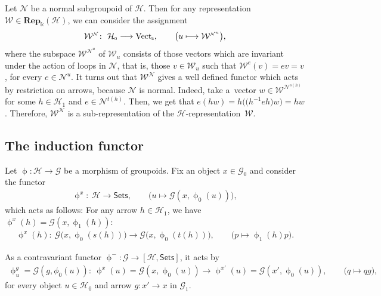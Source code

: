 \documentclass[10pt,a4paper]{amsart}
\numberwithin{equation}{section}
\newcommand{\Rep}[1]{\mathbf{Rep}_{\Sscript{\Bbbk}}(#1)}
\newcommand{\Vect}{{\rm Vect}_{\Sscript{\Bbbk}}}
\newcommand{\Go}{\cG_{\Sscript{0}}}
\newcommand{\Ga}{\cG_{\Sscript{1}}}
\newcommand{\Ho}{\cH_{\Sscript{0}}}
\newcommand{\Ha}{\cH_{\Sscript{1}}}
\newcommand{\Wu}{\cW_{\Sscript{u}}}
\newcommand{\We}{\cW^{\Sscript{e}}}
\newcommand{\cG}{{\mathcal G}}
\newcommand{\cH}{{\mathcal H}}
\newcommand{\cN}{{\mathcal N}}
\newcommand{\cW}{{\mathcal W}}
\newcommand{\phix}{\upphi^{\Sscript{x}}}
\newcommand{\phixp}{\upphi^{\Sscript{x'}}}
\newcommand{\Sets}{\mathsf{Sets}}
\newcommand{\Sscript}[1]{\scriptscriptstyle{#1}}
\begin{document}
\begin{Remark}\label{rem:WN} Let $\cN$ be a normal subgroupoid of $\cH$. Then for any representation $\cW \in \Rep{\cH}$, we can consider the assignment
\begin{gather*}
\cW^{\Sscript{\cN}}\colon \ \Ho \longrightarrow \Vect, \qquad \big( u \longmapsto \cW^{\Sscript{\cN^u}} \big),
\end{gather*}
where the subspace $\cW^{\Sscript{\cN^u}}$ of $\Wu$ consists of those vectors which are invariant under the action of loops in $\cN$, that is, those $v \in \Wu$ such that $\We(v)=e v=v$, for every $e \in \cN^{\Sscript{u}}$. It turns out that $\cW^{\Sscript{\cN}}$ gives a well defined functor which acts by restriction on arrows, because $\cN$ is normal. Indeed, take a~vector $w \in \cW^{\Sscript{\cN^{s(h)}}}$ for some $h \in \Ha$ and $e \in \cN^{\Sscript{t(h)}}$. Then, we get that $e (h w)= h \big(\big(h^{-1}eh\big)w \big)=h w$. Therefore, $\cW^{\Sscript{\cN}}$ is a sub-representation of the $\cH$-representation~$\cW$.
\end{Remark}

\subsection{The induction functor}\label{ssec:Ind}
Let $\upphi: \cH \to \cG$ be a morphism of groupoids. Fix an object $x \in \Go$ and consider the functor
\begin{gather*}
\phix\colon \ \cH \longrightarrow \Sets, \qquad \big( u \longmapsto \cG(x,\upphi_{\Sscript{0}}(u)) \big),
\end{gather*}
which acts as follows: For any arrow $h\in \Ha$, we have $\phix(h)=\cG(x, \upphi_{\Sscript{1}}(h))$:
\begin{gather}\label{Eq:Tartu}
\phix(h) \colon \ \cG\big(x, \upphi_{\Sscript{0}}(s(h)) \big) \longrightarrow \cG\big(x, \upphi_{\Sscript{0}}(t(h)) \big), \qquad \big( p \longmapsto \upphi_{\Sscript{1}}(h) p\big).
\end{gather}

As a contravariant functor $\upphi^{-}\colon \cG \to \left[\cH, \Sets\right]$, it acts by
\begin{gather}\label{Eq:Oslo}
\upphi^{\Sscript{g}}_u=\cG(g,\phi_{\Sscript{0}}(u))\colon \ \phix(u)=\cG(x,\upphi_{\Sscript{0}}(u) ) \longrightarrow \phixp(u)=\cG(x',\upphi_{\Sscript{0}}(u)), \qquad \big( q \longmapsto q g \big),
\end{gather}
for every object $u \in \Ho$ and arrow $g\colon x' \to x$ in $\Ga$.
\end{document}
